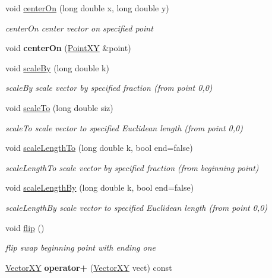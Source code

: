 \begin{DoxyCompactItemize}
\item 
void \hyperlink{classVectorXY_a55713178bb2845a83b858c5776194b6d}{center\+On} (long double x, long double y)
\begin{DoxyCompactList}\small\item\em center\+On center vector on specified point \end{DoxyCompactList}\item 
\hypertarget{classVectorXY_a2ff78c91d0896f2d32aba1d612b4e7e0}{}void {\bfseries center\+On} (\hyperlink{classPointXY}{Point\+X\+Y} \&point)\label{classVectorXY_a2ff78c91d0896f2d32aba1d612b4e7e0}

\item 
void \hyperlink{classVectorXY_a92c5fd3e5018183f59e409abd523b23b}{scale\+By} (long double k)
\begin{DoxyCompactList}\small\item\em scale\+By scale vector by specified fraction (from point 0,0) \end{DoxyCompactList}\item 
void \hyperlink{classVectorXY_a08ef32c78e917db26296e27a924504bf}{scale\+To} (long double siz)
\begin{DoxyCompactList}\small\item\em scale\+To scale vector to specified Euclidean length (from point 0,0) \end{DoxyCompactList}\item 
void \hyperlink{classVectorXY_a6cc6d38fbe0d949a6758d6b04ff61818}{scale\+Length\+To} (long double k, bool end=false)
\begin{DoxyCompactList}\small\item\em scale\+Length\+To scale vector by specified fraction (from beginning point) \end{DoxyCompactList}\item 
void \hyperlink{classVectorXY_aa4dfb1630e9d1b440a7f383a8f7f5bd8}{scale\+Length\+By} (long double k, bool end=false)
\begin{DoxyCompactList}\small\item\em scale\+Length\+By scale vector to specified Euclidean length (from point 0,0) \end{DoxyCompactList}\item 
\hypertarget{classVectorXY_a6d9d6f426a7dd4135a088da08823f371}{}void \hyperlink{classVectorXY_a6d9d6f426a7dd4135a088da08823f371}{flip} ()\label{classVectorXY_a6d9d6f426a7dd4135a088da08823f371}

\begin{DoxyCompactList}\small\item\em flip swap beginning point with ending one \end{DoxyCompactList}\item 
\hypertarget{classVectorXY_a5a65769eeb23d8c5d2deb0ef821777d9}{}\hyperlink{classVectorXY}{Vector\+X\+Y} {\bfseries operator+} (\hyperlink{classVectorXY}{Vector\+X\+Y} vect) const \label{classVectorXY_a5a65769eeb23d8c5d2deb0ef821777d9}


\end{DoxyCompactItemize}
